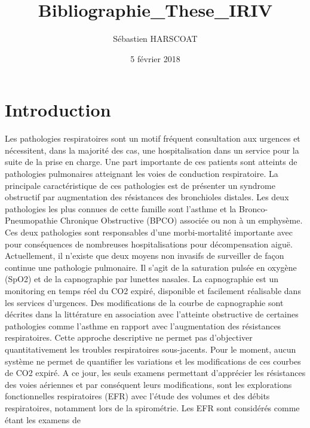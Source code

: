 \documentclass[12pt,]{article}
\title{Bibliographie\_These\_IRIV}
\author{Sébastien HARSCOAT}
\date{5 février 2018}
\begin{document}
\maketitle

{
\setcounter{tocdepth}{2}
\tableofcontents
}
\pagebreak

\listoffigures

\pagebreak

\listoftables

\pagebreak

\section{Introduction}\label{introduction}

Les pathologies respiratoires sont un motif fréquent consultation aux
urgences et nécessitent, dans la majorité des cas, une hospitalisation
dans un service pour la suite de la prise en charge. Une part importante
de ces patients sont atteints de pathologies pulmonaires atteignant les
voies de conduction respiratoire. La principale caractéristique de ces
pathologies est de présenter un syndrome obstructif par augmentation des
résistances des bronchioles distales. Les deux pathologies les plus
connues de cette famille sont l'asthme et la Bronco-Pneumopathie
Chronique Obstructive (BPCO) associée ou non à un emphysème. Ces deux
pathologies sont responsables d'une morbi-mortalité importante avec pour
conséquences de nombreuses hospitalisations pour décompensation aiguë.
Actuellement, il n'existe que deux moyens non invasifs de surveiller de
façon continue une pathologie pulmonaire. Il s'agit de la saturation
pulsée en oxygène (SpO2) et de la capnographie par lunettes nasales. La
capnographie est un monitoring en temps réel du CO2 expiré, disponible
et facilement réalisable dans les services d'urgences. Des modifications
de la courbe de capnographie sont décrites dans la littérature en
association avec l'atteinte obstructive de certaines pathologies comme
l'asthme en rapport avec l'augmentation des résistances respiratoires.
Cette approche descriptive ne permet pas d'objectiver quantitativement
les troubles respiratoires sous-jacents. Pour le moment, aucun système
ne permet de quantifier les variations et les modifications de ces
courbes de CO2 expiré. A ce jour, les seuls examens permettant
d'apprécier les résistances des voies aériennes et par conséquent leurs
modifications, sont les explorations fonctionnelles respiratoires (EFR)
avec l'étude des volumes et des débits respiratoires, notamment lors de
la spirométrie. Les EFR sont considérés comme étant les examens de
\end{document}
